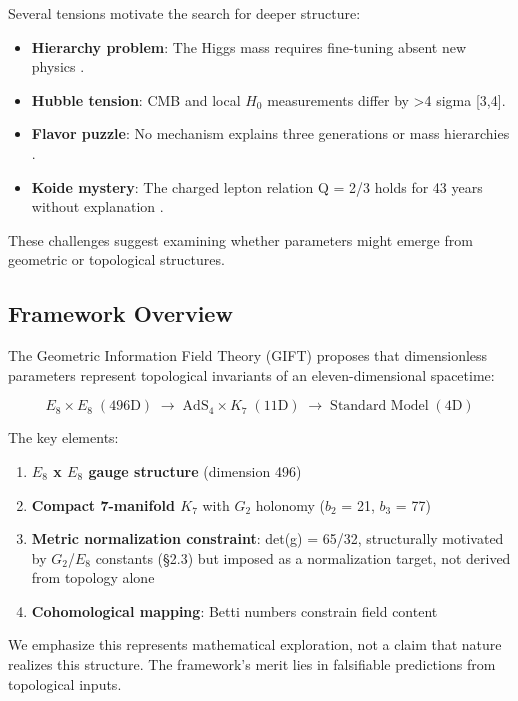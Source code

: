 \documentclass[11pt,a4paper]{article}
\begin{document}
Several tensions motivate the search for deeper structure:

\begin{itemize}

\item
  \textbf{Hierarchy problem}: The Higgs mass requires fine-tuning absent
  new physics \cite{2}.
\item
  \textbf{Hubble tension}: CMB and local \(H_{0}\) measurements differ
  by \textgreater4 sigma {[}3,4{]}.
\item
  \textbf{Flavor puzzle}: No mechanism explains three generations or
  mass hierarchies \cite{5}.
\item
  \textbf{Koide mystery}: The charged lepton relation Q = 2/3 holds for
  43 years without explanation \cite{6}.
\end{itemize}

These challenges suggest examining whether parameters might emerge from
geometric or topological structures.

\subsection{Framework Overview}

The Geometric Information Field Theory (GIFT) proposes that
dimensionless parameters represent topological invariants of an
eleven-dimensional spacetime:

\[
E_8 \times E_8 \;(\text{496D}) \;\longrightarrow\; \mathrm{AdS}_4 \times K_7 \;(\text{11D}) \;\longrightarrow\; \text{Standard Model}\;(\text{4D})
\]

The key elements:

\begin{enumerate}


\item
  \textbf{\(E_{8}\) x \(E_{8}\) gauge structure} (dimension 496)
\item
  \textbf{Compact 7-manifold \(K_{7}\)} with \(G_{2}\) holonomy
  (\(b_{2}\) = 21, \(b_{3}\) = 77)
\item
  \textbf{Metric normalization constraint}: det(g) = 65/32, structurally
  motivated by \(G_{2}\)/\(E_{8}\) constants (§2.3) but imposed as a
  normalization target, not derived from topology alone
\item
  \textbf{Cohomological mapping}: Betti numbers constrain field content
\end{enumerate}

We emphasize this represents mathematical exploration, not a claim that
nature realizes this structure. The framework's merit lies in
falsifiable predictions from topological inputs.
\end{document}
